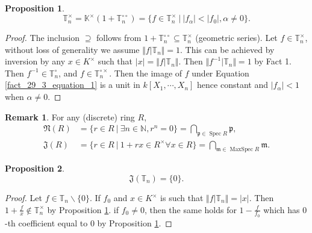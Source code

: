 \documentclass[10pt]{article}
\numberwithin{equation}{section}
\theoremstyle{definition}
\newtheorem{proposition}{Proposition}[subsection]
\newtheorem{remark}{Remark}[subsection]
\DeclareMathOperator{\MaxSpec}{MaxSpec}
\DeclareMathOperator{\Spec}{Spec}
\newcommand{\norm}[1]{\Vert #1 \Vert}
\newcommand{\N}[0]{\mathbb{N}}
\newcommand{\m}[0]{\mathfrak{m}}
\newcommand{\sep}[0]{\:|\:}
\newcommand{\p}[0]{\mathfrak{p}}
\newcommand{\ab}[1]{\vert #1 \vert}
\newcommand{\dcirc}[0]{{\circ\circ}}
\begin{document}
\begin{proposition}
    \label{fact_29_4_1}
    \begin{equation*}
        \mathbb{T}_n^\times = \mathbb{K}^\times (1+\mathbb{T}_n^\dcirc)=\{f\in\mathbb{T}_n^\times\sep\ab{f_\alpha}<\ab{f_0},\alpha\not=0\}.
    \end{equation*}
\end{proposition}
\begin{proof}
    The inclusion $\supseteq$ follows from $1+\mathbb{T}_n^\dcirc\subseteq\mathbb{T}_n^\times$ (geometric series). Let $f\in\mathbb{T}^\times_n$, without loss of generality we assume $\norm{f|\mathbb{T}_n}=1$. This can be achieved by inversion by any $x\in K^\times$ such that $\ab{x} = \norm{f|\mathbb{T}_n}$. 
    Then $\norm{f^{-1}|\mathbb{T}_n}=1$ by Fact 1. Then $f^{-1}\in \mathbb{T}_n^\circ$, and $f\in\mathbb{T}_n^{\circ\times}$. Then the image of $f$ under Equation \eqref{fact_29_3_equation_1} is a unit in $k[X_1,\cdots,X_n]$ hence constant and $\ab{f_\alpha}<1$ when $\alpha\not=0$.
\end{proof}

\begin{remark}
    For any (discrete) ring $R$, 
    \begin{align*}
        \mathfrak{N}(R) &= \{r\in R\sep \exists n\in\N, r^n = 0\}=\bigcap_{\p\in\Spec R}\p,\\
        \mathfrak{J}(R) &= \{r\in R\sep 1+rx\in R^\times\forall x\in R\} = \bigcap_{\m\in\MaxSpec R}\m.
    \end{align*}
\end{remark}

\begin{proposition}
    \label{fact_29_5}
    \begin{equation*}
        \mathfrak{J}(\mathbb{T}_n) = \{0\}.
    \end{equation*}
\end{proposition}
\begin{proof}
    Let $f\in\mathbb{T}_n\backslash\{0\}$. If $f_0$ and $x\in K^\times$ is such that $\norm{f|\mathbb{T}_n}=\ab{x}$. Then $1+{\frac f x}\not\in\mathbb{T}_n^\times$ by Proposition \ref{fact_29_4_1}. 
    if $f_0\not=0$, then the same holds for $1-{\frac f {f_0}}$ which has $0$-th coefficient equal to $0$ by Proposition \ref{fact_29_4_1}.
\end{proof}
\end{document}
